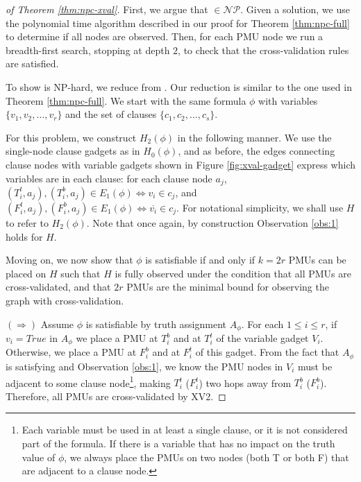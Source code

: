\begin{proof}[of Theorem \ref{thm:npc-xval}]
First, we argue that \xval $\in \mathcal{NP}$.  Given a \xval solution, we use
the polynomial time algorithm described in our proof for Theorem
\ref{thm:npc-full} to determine if all nodes are observed.  Then, for each
PMU node we run a breadth-first search, stopping at depth $2$, to check that
the cross-validation rules are satisfied.

To show \xval is NP-hard, we reduce from \sats.  Our reduction is similar to
the one used in Theorem \ref{thm:npc-full}.  We start with the same \sat formula $\phi$ with variables $\{v_1,v_2, \dots , v_r\}$ and the set of clauses $\{c_1,c_2,\dots , c_s \}$.

For this problem, we construct $H_2(\phi)$ in the following manner. We use the single-node clause gadgets  as in $H_0(\phi)$, and as before, the edges connecting clause nodes with variable gadgets shown in Figure \ref{fig:xval-gadget} express which variables are in each clause: for each clause node $a_j$, $(T^t_i, a_j),(T^b_i, a_j)\in E_1(\phi) \Leftrightarrow v_i\in c_j$, and $(F^t_i, a_j),(F^b_i, a_j)\in E_1(\phi) \Leftrightarrow \overline{v_i}\in c_j$. For notational simplicity, we shall use $H$ to refer to $H_2(\phi)$. Note that once again, by construction Observation \ref{obs:1} holds for $H$.

Moving on, we now show that $\phi$ is satisfiable if and only if
$k=2r$ PMUs can be placed on $H$ such that $H$ is fully observed under the
condition that all PMUs are cross-validated, and that $2r$ PMUs are the minimal
bound for observing the graph with cross-validation.

$(\Rightarrow)$ Assume $\phi$ is satisfiable by truth assignment $A_{\phi}$.
For each $1\leq i\leq r$, if $v_i=True$ in $A_{\phi}$ we place a PMU at $T_i^b$
and at $T_i^t$ of the variable gadget $V_i$. Otherwise, we place a PMU at $F_i^b$
and at $F_i^t$ of this gadget. From the fact that $A_{\phi}$ is satisfying and Observation \ref{obs:1}, we know the PMU nodes in $V_i$ must be
adjacent to some clause node\footnote{Each variable must be used in at least a single clause, or it is not considered part of the formula. If there is a variable that has no impact on the truth value of $\phi$, we always place the PMUs on two nodes (both T or both F) that are adjacent to a clause node.}, making $T_i^t$ ($F_i^t$) two hops away from
$T_i^b$ ($F_i^b$). Therefore, all PMUs are cross-validated by XV2.


\end{proof}
